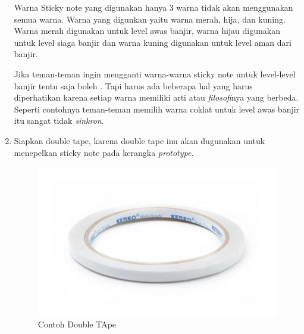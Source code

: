 \begin{enumerate}
\par Warna Sticky note yang digunakan hanya 3 warna tidak akan menggunakan semua warna. Warna yang digunkan yaitu warna merah, hija, dan kuning. Warna merah digunakan untuk level awas banjir, warna hijau digunakan untuk level siaga banjir dan warna kuning digunakan untuk level aman dari banjir.

\par Jika teman-teman ingin mengganti warna-warna sticky note untuk level-level banjir tentu saja boleh . Tapi harus ada beberapa hal yang harus diperhatikan karena setiap warna memiliki arti atau \textit{filosofi}nya yang berbeda. Seperti contohnya teman-teman memilih warna coklat untuk level awas banjir itu sangat tidak \textit{sinkron}.

\item Siapkan double tape, karena double tape inu akan dugunakan untuk menepelkan sticky note pada kerangka \textit{prototype}.

\begin{figure}[H]
\centering
\includegraphics[width=1\textwidth]{figures/double.jpg}
\caption{Contoh Double TApe}
\label{print}
\end{figure}


\end{enumerate}
